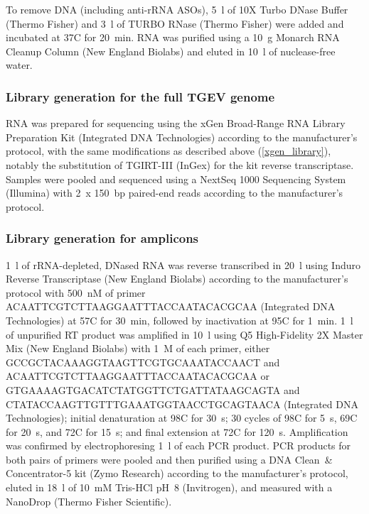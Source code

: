 \documentclass[main.tex]{subfiles}
\begin{document}
To remove DNA (including anti-rRNA ASOs), 5~\textmu l of 10X Turbo DNase Buffer (Thermo Fisher) and 3~\textmu l of TURBO RNase (Thermo Fisher) were added and incubated at 37\textdegree C for 20~min.
RNA was purified using a 10~\textmu g Monarch RNA Cleanup Column (New England Biolabs) and eluted in 10~\textmu l of nuclease-free water.

\subsubsection{Library generation for the full TGEV genome}

RNA was prepared for sequencing using the xGen Broad-Range RNA Library Preparation Kit (Integrated DNA Technologies) according to the manufacturer’s protocol, with the same modifications as described above (\ref{xgen_library}), notably the substitution of TGIRT-III (InGex) for the kit reverse transcriptase.
Samples were pooled and sequenced using a NextSeq 1000 Sequencing System (Illumina) with 2~x 150~bp paired-end reads according to the manufacturer's protocol.

\subsubsection{Library generation for amplicons}

1~\textmu l of rRNA-depleted, DNased RNA was reverse transcribed in 20~\textmu l using Induro Reverse Transcriptase (New England Biolabs) according to the manufacturer's protocol with 500~nM of primer ACAATTCGTCTTAAGGAATTTACCAATACACGCAA (Integrated DNA Technologies) at 57\textdegree C for 30~min, followed by inactivation at 95\textdegree C for 1~min.
1~\textmu l of unpurified RT product was amplified in 10~\textmu l using Q5 High-Fidelity 2X Master Mix (New England Biolabs) with 1~\textmu M of each primer, either GCCGCTACAAAGGTAAGTTCGTGCAAATACCAACT and ACAATTCGTCTTAAGGAATTTACCAATACACGCAA or GTGAAAAGTGACATCTATGGTTCTGATTATAAGCAGTA and CTATACCAAGTTGTTTGAAATGGTAACCTGCAGTAACA (Integrated DNA Technologies); initial denaturation at 98\textdegree C for 30~s; 30 cycles of 98\textdegree C for 5~s, 69\textdegree C for 20~s, and 72\textdegree C for 15~s; and final extension at 72\textdegree C for 120~s.
Amplification was confirmed by electrophoresing 1~\textmu l of each PCR product.
PCR products for both pairs of primers were pooled and then purified using a DNA Clean~\& Concentrator-5 kit (Zymo Research) according to the manufacturer's protocol, eluted in 18~\textmu l of 10~mM Tris-HCl pH~8 (Invitrogen), and measured with a NanoDrop (Thermo Fisher Scientific).
\end{document}
